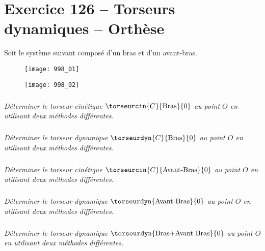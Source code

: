 \section*{Exercice 126 -- Torseurs dynamiques -- Orthèse}
\setcounter{exo}{0}


Soit le système suivant composé d'un bras et d'un avant-bras.

\begin{figure}[H]
\centering
\texttt{[image: 998\_01]}
\end{figure}

\begin{figure}[H]
\centering
\texttt{[image: 998\_02]}
\end{figure}

\subparagraph{}
\textit{Déterminer le torseur cinétique $\torseurcin{C}{\text{Bras}}{0}$ au point $O$ en utilisant deux méthodes différentes.}
\ifprof
\begin{corrige}
\end{corrige}
\else
\fi

\subparagraph{}
\textit{Déterminer le torseur dynamique $\torseurdyn{C}{\text{Bras}}{0}$ au point $O$ en utilisant deux méthodes différentes.}
\ifprof
\begin{corrige}
\end{corrige}
\else
\fi

\subparagraph{}
\textit{Déterminer le torseur cinétique $\torseurcin{C}{\text{Avant-Bras}}{0}$ au point $O$ en utilisant deux méthodes différentes.}
\ifprof
\begin{corrige}
\end{corrige}
\else
\fi

\subparagraph{}
\textit{Déterminer le torseur dynamique $\torseurdyn{\text{Avant-Bras}}{0}$ au point $O$ en utilisant deux méthodes différentes.}
\ifprof
\begin{corrige}
\end{corrige}
\else
\fi


\subparagraph{}
\textit{Déterminer le torseur dynamique $\torseurdyn{\text{Bras+Avant-Bras}}{0}$ au point $O$ en utilisant deux méthodes différentes.}
\ifprof
\begin{corrige}
\end{corrige}
\else
\fi

